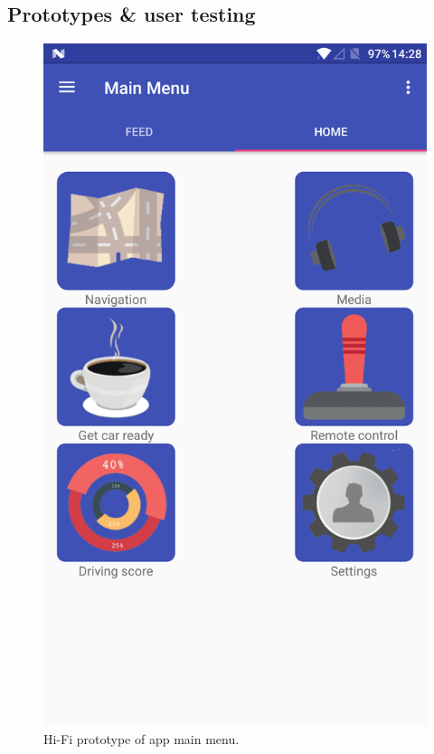 \documentclass{article}
\begin{document}
\subsection{Prototypes \& user testing}\label{ssec:app-prototypes-testing}
  \begin{figure}[H]
    \centering
    \includegraphics[scale=0.25]{main-menu}
    \caption{Hi-Fi prototype of app main menu.}\label{main-menu}
  \end{figure}
\end{document}

